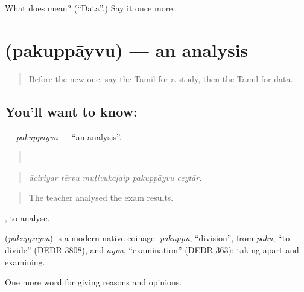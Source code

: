 \begin{tcolorbox}[breakable,colback=teal!4,colframe=teal!35!black,title={Before you move on}]
What does  mean? (\textquotedblleft{}Data\textquotedblright{}.) Say it once more.
\end{tcolorbox}
\section[\texorpdfstring{\ta{பகுப்பாய்வு} (pakuppāyvu)}{பகுப்பாய்வு (pakuppāyvu)}]{ (pakuppāyvu) — an analysis}

\label{lesson:TA-C362-pakuppayvu}



\begin{quote}
Before the new one: say the Tamil for a study, then the Tamil for data.
\end{quote}

\subsection*{You'll want to know: }
\textbf{} — \emph{pakuppāyvu} — \textquotedblleft{}an analysis\textquotedblright{}.

\begin{quote}
    .
\end{quote}

\begin{quote}
\emph{āciriyar tērvu muṭivukaḷaip pakuppāyvu ceytār.}
\end{quote}

\begin{quote}
The teacher analysed the exam results.
\end{quote}

 , to analyse.

\begin{cousinweb}
\textbf{} (\emph{pakuppāyvu}) is a modern native coinage: \emph{pakuppu}, \textquotedblleft{}division\textquotedblright{}, from \emph{paku}, \textquotedblleft{}to divide\textquotedblright{} (DEDR 3808), and \emph{āyvu}, \textquotedblleft{}examination\textquotedblright{} (DEDR 363): taking apart and examining.
\end{cousinweb}

\begin{grammarlens}[title={What you've built}]
One more word for giving reasons and opinions.
\end{grammarlens}

